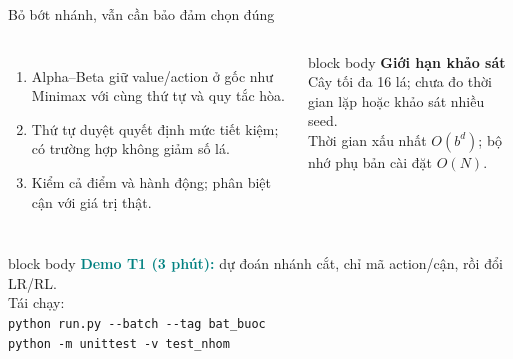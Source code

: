 \documentclass[aspectratio=169,10pt]{beamer}
\begin{document}
\begin{frame}{Bỏ bớt nhánh, vẫn cần bảo đảm chọn đúng}
\begin{columns}[T,onlytextwidth]
\begin{enumerate}\setlength{\itemsep}{8pt}
  \item Alpha--Beta giữ value/action ở gốc như Minimax với cùng thứ tự và quy tắc hòa.
  \item Thứ tự duyệt quyết định mức tiết kiệm; có trường hợp không giảm số lá.
  \item Kiểm cả điểm và hành động; phân biệt cận với giá trị thật.
\end{enumerate}
\begin{beamercolorbox}[rounded=true,sep=8pt,wd=\linewidth]{block body}
\textbf{Giới hạn khảo sát}\\
Cây tối đa 16 lá; chưa đo thời gian lặp hoặc khảo sát nhiều seed.\\[4pt]
\small Thời gian xấu nhất $O(b^d)$; bộ nhớ phụ bản cài đặt $O(N)$.\\[4pt]
\end{beamercolorbox}
\end{columns}
\vspace{9pt}
\begin{beamercolorbox}[rounded=true,sep=7pt,wd=\linewidth]{block body}
\textcolor{Teal}{\bfseries Demo T1 (3 phút):} dự đoán nhánh cắt, chỉ mã action/cận, rồi đổi LR/RL.\\[4pt]
\scriptsize Tái chạy:\\
\texttt{python run.py -{}-batch -{}-tag bat\_buoc}\\
\texttt{python -m unittest -v test\_nhom}
\end{beamercolorbox}
\end{frame}
\end{document}
